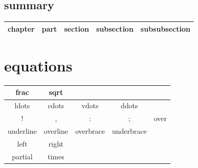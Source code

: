 \documentclass{article}[20pt]
\begin{document}
\subsection{summary}

\begin{tabular}{|c|c|c|c|c|}\hline
	chapter & part & section & subsection & subsubsection \\ \hline
\end{tabular}
\section{equations}
\begin{tabular}{|c|c|c|c|c|}\hline
	frac & sqrt & & & \\ \hline
	ldots & cdots & vdots  &  ddots &\\ \hline
	! & , & : & ; & over \\ \hline
	underline & overline & overbrace & underbrace & \\ \hline
	 left & right & & &\\ \hline
	 partial & times & & &\\ \hline
\end{tabular} 
\end{document}
